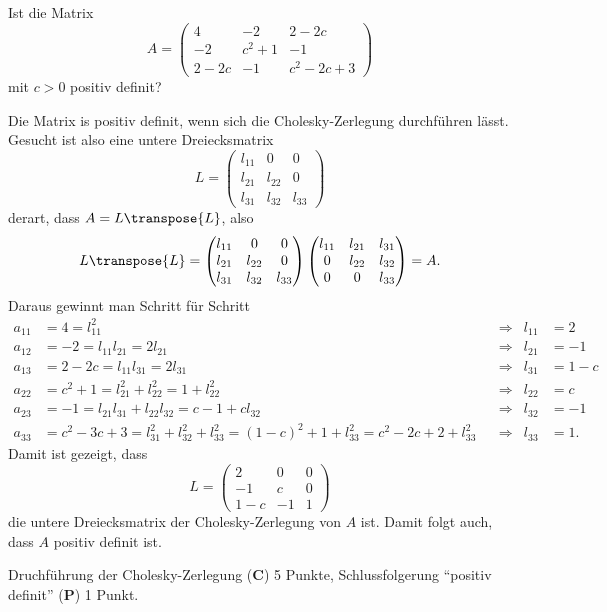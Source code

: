 Ist die Matrix
\[
A=
\begin{pmatrix}
4&-2&2-2c\\
-2&c^2+1&-1\\
2-2c&-1&c^2-2c+3
\end{pmatrix}
\]
mit $c>0$ positiv definit?

\begin{loesung}
Die Matrix is positiv definit, wenn sich die Cholesky-Zerlegung durchführen
lässt.
Gesucht ist also eine untere Dreiecksmatrix
\[
L=
\begin{pmatrix}
l_{11}&     0&     0\\
l_{21}&l_{22}&     0\\
l_{31}&l_{32}&l_{33}
\end{pmatrix}
\]
derart, dass $A=L\transpose{L}$, also
\[
L\transpose{L}
=
\begin{pmatrix}
l_{11}&     0&     0\\
l_{21}&l_{22}&     0\\
l_{31}&l_{32}&l_{33}
\end{pmatrix}
\begin{pmatrix}
l_{11}&l_{21}&l_{31}\\
     0&l_{22}&l_{32}\\
     0&     0&l_{33}
\end{pmatrix}
=
A.
\]
Daraus gewinnt man Schritt für Schritt
\begin{align*}
a_{11}
&=
4
=
l_{11}^2
&&\Rightarrow& l_{11} &= 2
\\
a_{12}
&=
-2
=
l_{11}l_{21}
=
2l_{21}
&&\Rightarrow& l_{21} &= -1
\\
a_{13}
&=
2-2c
=
l_{11}l_{31}
=2l_{31}
&&\Rightarrow& l_{31} &=1-c
\\
a_{22}
&=
c^2+1
=
l_{21}^2 + l_{22}^2 = 1 + l_{22}^2
&&\Rightarrow& l_{22} &= c
\\
a_{23}
&=
-1
=
l_{21}l_{31}+l_{22}l_{32}
=
c-1+cl_{32}
&&\Rightarrow& l_{32} &= -1
\\
a_{33}
&=
c^2-3c+3
=
l_{31}^2+l_{32}^2+l_{33}^2
=
(1-c)^2+1+l_{33}^2
=
c^2-2c+2+l_{33}^2
&&\Rightarrow& l_{33} &= 1.
\end{align*}
Damit ist gezeigt, dass
\[
L=\begin{pmatrix}
2&0&0\\
-1&c&0\\
1-c&-1&1
\end{pmatrix}
\]
die untere Dreiecksmatrix der Cholesky-Zerlegung von $A$ ist.
Damit folgt auch, dass $A$ positiv definit ist.
\end{loesung}

\begin{bewertung}
Druchführung der Cholesky-Zerlegung ({\bf C}) 5 Punkte,
Schlussfolgerung ``positiv definit'' ({\bf P}) 1 Punkt.
\end{bewertung}

